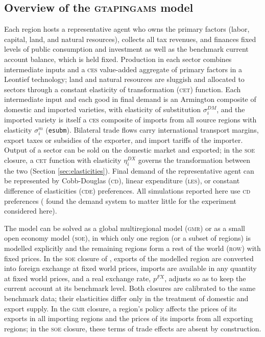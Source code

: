 \documentclass{jgea}
\newcommand{\CES}{\textsc{ces}\xspace}
\newcommand{\CET}{\textsc{cet}\xspace}
\newcommand{\CD}{\textsc{cd}\xspace}
\newcommand{\CDE}{\textsc{cde}\xspace}
\newcommand{\LES}{\textsc{les}\xspace}
\newcommand{\SOE}{\textsc{soe}\xspace}
\newcommand{\GMR}{\textsc{gmr}\xspace}
\newcommand{\GTAPINGAMS}{\textsc{gtapingams}\xspace}
\begin{document}
\subsection{Overview of the \GTAPINGAMS model}

Each region hosts a representative agent who owns the primary factors (labor, capital, land, and natural resources), collects all tax revenues, and finances fixed levels of public consumption and investment as well as the benchmark current account balance, which is held fixed.
Production in each sector combines intermediate inputs and a \CES value-added aggregate of primary factors in a Leontief technology; land and natural resources are sluggish and allocated to sectors through a constant elasticity of transformation (\CET) function.
Each intermediate input and each good in final demand is an Armington composite of domestic and imported varieties, with elasticity of substitution $\sigma^{DM}_i$, and the imported variety is itself a \CES composite of imports from all source regions with elasticity $\sigma^m_i$ (\texttt{esubm}).
Bilateral trade flows carry international transport margins, export taxes or subsidies of the exporter, and import tariffs of the importer.
Output of a sector can be sold on the domestic market and exported; in the \SOE closure, a \CET function with elasticity $\eta^{DX}_i$ governs the transformation between the two (Section \ref{sec:elasticities}).
Final demand of the representative agent can be represented by Cobb-Douglas (\CD), linear expenditure (\LES), or constant difference of elasticities (\CDE) preferences.
All simulations reported here use \CD preferences (\citealt{LanzRutherford2016} found the demand system to matter little for the experiment considered here).

The model can be solved as a global multiregional model (\GMR) or as a small open economy model (\SOE), in which only one region (or a subset of regions) is modelled explicitly and the remaining regions form a rest of the world (\textsc{row}) with fixed prices.
In the \SOE closure of \citet{LanzRutherford2016}, exports of the modelled region are converted into foreign exchange at fixed world prices, imports are available in any quantity at fixed world prices, and a real exchange rate, $p^{FX}$, adjusts so as to keep the current account at its benchmark level.
Both closures are calibrated to the same benchmark data; their elasticities differ only in the treatment of domestic and export supply.
In the \GMR closure, a region's policy affects the prices of its exports in all importing regions and the prices of its imports from all exporting regions; in the \SOE closure, these terms of trade effects are absent by construction.
\end{document}
